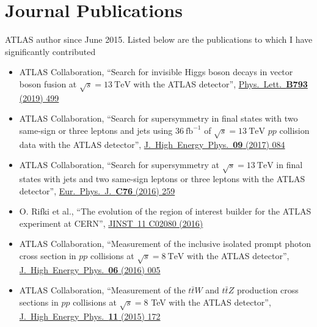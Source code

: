 \documentclass[a4paper,10pt]{article}
\begin{document}
\section{Journal Publications}
{ATLAS author since June 2015. Listed below are the publications to which I have significantly contributed}
\begin{itemize}
	\item ATLAS Collaboration,
	``Search for invisible Higgs boson decays in vector boson fusion at $\sqrt{s}=13\ \mathrm{TeV}$ with the ATLAS detector'',
	\href{https://www.sciencedirect.com/science/article/pii/S0370269319302564}{Phys.\ Lett.\ {\bf B793} (2019) 499}
	\item ATLAS Collaboration,
	``Search for supersymmetry in final states with two same-sign or three leptons and jets using $36\ \mathrm{fb}^{-1}$ of $\sqrt{s}=13\ \mathrm{TeV}$ $pp$ collision data with the ATLAS detector'',
	\href{https://link.springer.com/article/10.1007/JHEP09(2017)084}{J.\ High\ Energy\ Phys.\ {\bf 09} (2017) 084}
	\item ATLAS Collaboration,
	``Search for supersymmetry at $\sqrt{s}=13\ \mathrm{TeV}$ in final states with jets and two same-sign leptons or three leptons with the ATLAS detector'',
	\href{https://link.springer.com/article/10.1140/epjc/s10052-016-4095-8}{Eur.\ Phys.\ J.\ {\bf C76} (2016) 259}
	\item O. Rifki et al.,
	``The evolution of the region of interest builder for the ATLAS experiment at CERN'',
	\href{https://iopscience.iop.org/article/10.1088/1748-0221/11/02/C02080}{JINST\ 11 C02080 (2016) }
	\item ATLAS Collaboration,
	``Measurement of the inclusive isolated prompt photon cross section in $pp$ collisions at $\sqrt{s}=8\ \mathrm{TeV}$ with the ATLAS detector'',
	\href{https://link.springer.com/article/10.1007/JHEP08(2016)005}{J.\ High\ Energy\ Phys.\ {\bf 06} (2016) 005 }
	\item ATLAS Collaboration,
	``Measurement of the $t\bar{t}W$ and $t\bar{t}Z$ production cross sections in $pp$ collisions at $\sqrt{s} = 8$ TeV with the ATLAS detector'',
	\href{https://link.springer.com/article/10.1007/JHEP08(2016)005}{J.\ High\ Energy\ Phys.\ {\bf 11} (2015) 172 }

\end{itemize}
\end{document}
